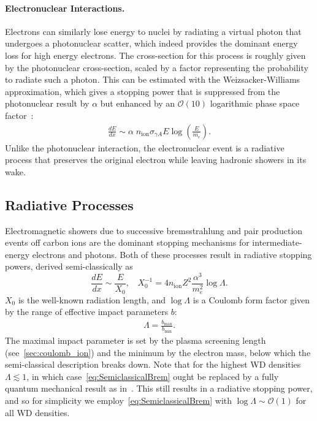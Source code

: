 \documentclass[preprintnumbers,amsmath,amssymb,prd,superscriptaddress]{revtex4}
\newcommand{\OO}{\mathcal{O}}
\newcommand{\xmin}{\text{min}}
\newcommand{\xmax}{\text{max}}
\newcommand{\ion}{\text{ion}}
\def\r{\right)}
\def\l{\left(}
\begin{document}
\begin{appendices}
\paragraph{Electronuclear Interactions.}
Electrons can similarly lose energy to nuclei by radiating a virtual photon that undergoes a photonuclear scatter, which indeed provides the dominant energy loss for high energy electrons.
The cross-section for this process is roughly given by the photonuclear cross-section, scaled by a factor representing the probability to radiate such a photon.
This can be estimated with the Weizsacker-Williams approximation, which gives a stopping power that is suppressed from the photonuclear result by $\alpha$ but enhanced by an $\OO(10)$ logarithmic phase space factor~\cite{Gerhardt:2010bj}:
\begin{align}
    \frac{dE}{dx} \sim \alpha \; n_\ion \sigma_{\gamma A} E
    \log\l\frac{E}{m_e}\r.
\end{align}
Unlike the photonuclear interaction, the electronuclear event is a radiative process that preserves the original electron while leaving hadronic showers in its wake.

\subsection{Radiative Processes}
\label{sec:emshowers}

Electromagnetic showers due to successive bremsstrahlung and pair production events off carbon ions are the dominant stopping mechanisms for intermediate-energy electrons and photons.
Both of these processes result in radiative stopping powers, derived semi-classically as~\cite{Klein:1998du}
\begin{equation}
\label{eq:SemiclassicalBrem}
\frac{dE}{dx} \sim \frac{E}{X_0}, ~~~~ X_0^{-1} = 4 n_\ion Z^2 \frac{\alpha^3}{m_e^2} \log{\Lambda}.
\end{equation}
$X_0$ is the well-known radiation length, and $\log\Lambda$ is a Coulomb form factor given by the range of effective impact parameters $b$:
\begin{align}
  \Lambda = \frac{b_\xmax}{b_\xmin}.
\end{align}
The maximal impact parameter is set by the plasma screening length (see~\ref{sec:coulomb_ion}) and the minimum by the electron mass, below which the semi-classical description breaks down.
Note that for the highest WD densities $\Lambda \lesssim 1$, in which case~\eqref{eq:SemiclassicalBrem} ought be replaced by a fully quantum mechanical result as in~\cite{Bethe1934}.
This still results in a radiative stopping power, and so for simplicity we employ~\eqref{eq:SemiclassicalBrem} with $\log{\Lambda} \sim \OO(1)$ for all WD densities.


\end{appendices}
\end{document}
